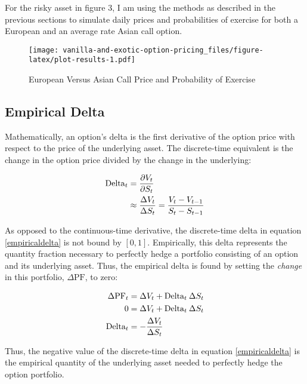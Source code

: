 \documentclass[
  12pt,
]{article}
\begin{document}
For the risky asset in figure 3, I am using the methods as described in
the previous sections to simulate daily prices and probabilities of
exercise for both a European and an average rate Asian call option.

\begin{figure}
\centering
\texttt{[image: vanilla-and-exotic-option-pricing\_files/figure-latex/plot-results-1.pdf]}
\caption{European Versus Asian Call Price and Probability of Exercise}
\end{figure}

\hypertarget{empirical-delta}{%
\subsection{Empirical Delta}\label{empirical-delta}}

Mathematically, an option's delta is the first derivative of the option
price with respect to the price of the underlying asset. The
discrete-time equivalent is the change in the option price divided by
the change in the underlying:

\begin{align}
\text{Delta}_t &= \frac{\partial V_{t}}{\partial S_t} \notag\\
\vspace{20mm}
&\approx \frac{\Delta V_{t}}{\Delta S_t} = \frac{V_t - V_{t-1}}{S_t-S_{t-1}}
\label{empiricaldelta}
\end{align}

As opposed to the continuous-time derivative, the discrete-time delta in
equation \eqref{empiricaldelta} is not bound by \([0,1]\). Empirically,
this delta represents the quantity fraction necessary to perfectly hedge
a portfolio consisting of an option and its underlying asset. Thus, the
empirical delta is found by setting the \emph{change} in this portfolio,
\(\Delta \text{PF}\), to zero:

\begin{align}
\Delta \text{PF}_t &= \Delta V_t + \text{Delta}_t \: \Delta S_t \notag\\
0 &= \Delta V_t + \text{Delta}_t \: \Delta S_t \notag\\
\vspace{4mm}
\text{Delta}_t &= - \frac{\Delta V_{t}}{\Delta S_t} \notag
\end{align}

Thus, the negative value of the discrete-time delta in equation
\eqref{empiricaldelta} is the empirical quantity of the underlying asset
needed to perfectly hedge the option portfolio.
\end{document}

